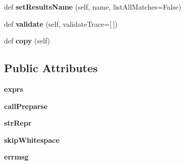 \begin{DoxyCompactItemize}
def {\bfseries set\+Results\+Name} (self, name, list\+All\+Matches=False)
\item 
\mbox{\label{classpkg__resources_1_1__vendor_1_1pyparsing_1_1_parse_expression_a1b1f5c9a08dd00461b991465cc5e2fd6}} 
def {\bfseries validate} (self, validate\+Trace=\mbox{[}$\,$\mbox{]})
\item 
\mbox{\label{classpkg__resources_1_1__vendor_1_1pyparsing_1_1_parse_expression_a933c4e7e560659c0b4db924fc3ee65bf}} 
def {\bfseries copy} (self)
\end{DoxyCompactItemize}
\subsection*{Public Attributes}
\begin{DoxyCompactItemize}
\item 
\mbox{\label{classpkg__resources_1_1__vendor_1_1pyparsing_1_1_parse_expression_ae9e07a06d183190717e964e7ff907363}} 
{\bfseries exprs}
\item 
\mbox{\label{classpkg__resources_1_1__vendor_1_1pyparsing_1_1_parse_expression_ae3f6313cd22d32d51cce032f55a5aa33}} 
{\bfseries call\+Preparse}
\item 
\mbox{\label{classpkg__resources_1_1__vendor_1_1pyparsing_1_1_parse_expression_a0cfce95a34e588692286483d95450df7}} 
{\bfseries str\+Repr}
\item 
\mbox{\label{classpkg__resources_1_1__vendor_1_1pyparsing_1_1_parse_expression_a21811d605b31df5c68dc3db16e0dc3e2}} 
{\bfseries skip\+Whitespace}
\item 
\mbox{\label{classpkg__resources_1_1__vendor_1_1pyparsing_1_1_parse_expression_a91ef46b1164f57d4f3abf7a1d37a8ecf}} 
{\bfseries errmsg}
\end{DoxyCompactItemize}
